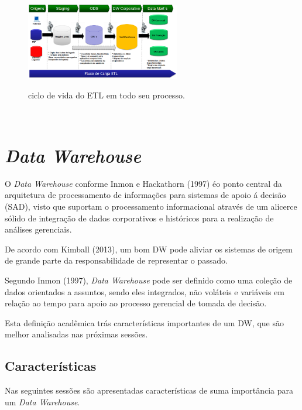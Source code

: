 \begin{figure}[H]
	\vspace*{0,2cm}
    \centering
    \caption{ciclo de vida do ETL em todo seu processo.}
    \includegraphics[width=0.6\textwidth]{./04-figuras/figura-05}
    \label{fig:ilustfig05}
\end{figure}
\vspace*{-0,9cm}
{\raggedright {}}\\

\section{\textit{Data Warehouse}}

O \textit{Data Warehouse} conforme Inmon e Hackathorn (1997) \'{e}o ponto central da arquitetura de processamento de informações para sistemas de apoio á decisão (SAD), visto que suportam o processamento informacional através de um alicerce sólido de integração de dados corporativos e históricos para a realização de análises gerenciais.

De acordo com Kimball (2013), um bom DW pode aliviar os sistemas de origem de grande parte da responsabilidade de representar o passado.

Segundo Inmon (1997), \textit{Data Warehouse} pode ser definido como uma coleção de dados orientados a assuntos, sendo eles integrados, não voláteis e variáveis em relação ao tempo para apoio ao processo gerencial de tomada de decisão.

Esta definição acadêmica trás características importantes de um DW, que são melhor analisadas nas próximas sessões.

\subsection{Características}

Nas seguintes sessões são apresentadas características de suma importância para um \textit{Data Warehouse}.

